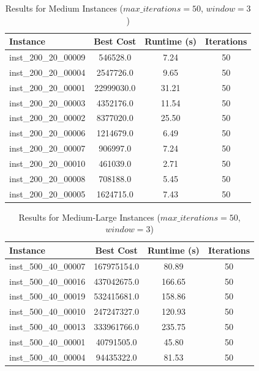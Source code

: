 \documentclass{article}
\begin{document}
\begin{table}[H]
\centering
\caption{Results for Medium Instances ($max\_iterations = 50$, $window = 3$)}
\begin{tabular}{lccc}
\toprule
\textbf{Instance} & \textbf{Best Cost} & \textbf{Runtime (s)} & \textbf{Iterations} \\
\midrule
inst\_200\_20\_00009 & 546528.0   & 7.24  & 50 \\
inst\_200\_20\_00004 & 2547726.0  & 9.65  & 50 \\
inst\_200\_20\_00001 & 22999030.0 & 31.21 & 50 \\
inst\_200\_20\_00003 & 4352176.0  & 11.54 & 50 \\
inst\_200\_20\_00002 & 8377020.0  & 25.50 & 50 \\
inst\_200\_20\_00006 & 1214679.0  & 6.49  & 50 \\
inst\_200\_20\_00007 & 906997.0   & 7.24  & 50 \\
inst\_200\_20\_00010 & 461039.0   & 2.71  & 50 \\
inst\_200\_20\_00008 & 708188.0   & 5.45  & 50 \\
inst\_200\_20\_00005 & 1624715.0  & 7.43  & 50 \\
\bottomrule
\end{tabular}
\label{tab:results_200_20}
\end{table}

\begin{table}[H]
\centering
\caption{Results for Medium-Large Instances ($max\_iterations = 50$, $window=3$)}
\begin{tabular}{lccc}
\toprule
\textbf{Instance} & \textbf{Best Cost} & \textbf{Runtime (s)} & \textbf{Iterations} \\
\midrule
inst\_500\_40\_00007 & 167975154.0 & 80.89  & 50 \\
inst\_500\_40\_00016 & 437042675.0 & 166.65 & 50 \\
inst\_500\_40\_00019 & 532415681.0 & 158.86 & 50 \\
inst\_500\_40\_00010 & 247247327.0 & 120.93 & 50 \\
inst\_500\_40\_00013 & 333961766.0 & 235.75 & 50 \\
inst\_500\_40\_00001 & 40791505.0  & 45.80  & 50 \\
inst\_500\_40\_00004 & 94435322.0  & 81.53  & 50 \\
\bottomrule
\end{tabular}
\label{tab:results_500_40}
\end{table}
\end{document}
